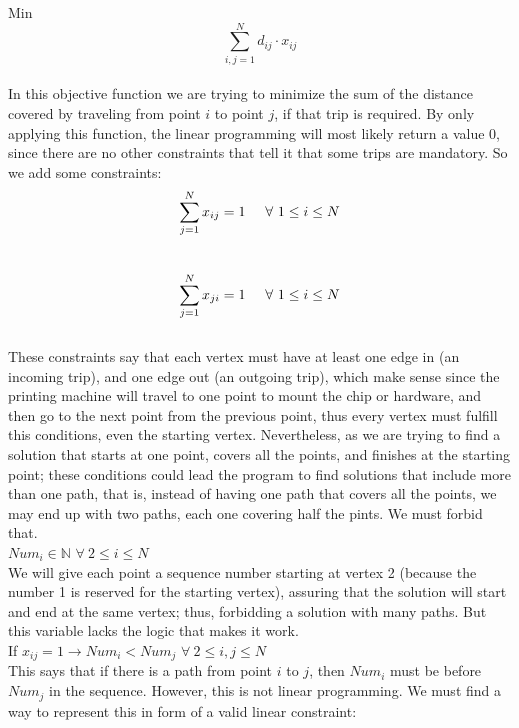 \documentclass[11pt, oneside]{article}   	%
\begin{document}
Min $$\sum_{i,j = 1}^{N} d_{ij} \cdot x_{ij}$$ \\

In this objective function we are trying to minimize the sum of the distance covered by traveling from point $i$ to point $j$, if that trip is required. By only applying this function, the linear programming will most likely return a value 0, since there are no other constraints that tell it that some trips are mandatory. So we add some constraints:\\

$$\sum_{j = 1}^{N} x_{ij} = 1 \hspace{5 mm}  \forall{}\ 1 \leq i \leq N$$\\

$$\sum_{j = 1}^{N} x_{ji} = 1 \hspace{5 mm} \forall{}\ 1 \leq i \leq N$$\\

These constraints say that each vertex must have at least one edge in (an incoming trip), and one edge out (an outgoing trip), which make sense since the printing machine will travel to one point to mount the chip or hardware, and then go to the next point from the previous point, thus every vertex must fulfill this conditions, even the starting vertex. Nevertheless, as we are trying to find a solution that starts at one point, covers all the points, and finishes at the starting point; these conditions could lead the program to find solutions that include more than one path, that is, instead of having one path that covers all the points, we may end up with two paths, each one covering half the pints. We must forbid that.\\

$Num_i \in \mathbb{N}$  \hspace{5 mm}  $\forall{}\ 2 \leq i \leq N$\\

We will give each point a sequence number starting at vertex 2 (because the number 1 is reserved for the starting vertex), assuring that the solution will start and end at the same vertex; thus, forbidding a solution with many paths. But this variable lacks the logic that makes it work.\\

If $x_{ij} = 1 \rightarrow Num_i < Num_j$ \hspace{5 mm} $\forall{}\ 2 \leq i,j \leq N$\\

This says that if there is a path from point $i$ to $j$, then $Num_i$ must be before $Num_j$ in the sequence. However, this is not linear programming. We must find a way to represent this in form of a valid linear constraint:\\
\end{document}
